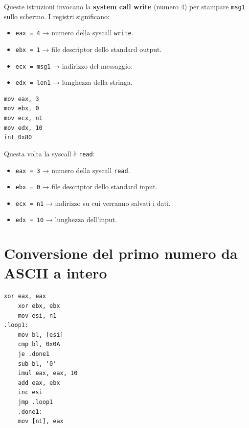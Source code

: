 \documentclass[a4paper,12pt]{article}
\begin{document}
	Queste istruzioni invocano la \textbf{system call write} (numero 4) per stampare \texttt{msg1} sullo schermo.  
	I registri significano:
	\begin{itemize}
		\item \texttt{eax = 4} → numero della syscall \texttt{write}.
		\item \texttt{ebx = 1} → file descriptor dello standard output.
		\item \texttt{ecx = msg1} → indirizzo del messaggio.
		\item \texttt{edx = len1} → lunghezza della stringa.
	\end{itemize}
	
	\begin{lstlisting}[language={[x86masm]Assembler}]
mov eax, 3
mov ebx, 0
mov ecx, n1
mov edx, 10
int 0x80
	\end{lstlisting}
	
	Questa volta la syscall è \texttt{read}:
	\begin{itemize}
		\item \texttt{eax = 3} → numero della syscall \texttt{read}.
		\item \texttt{ebx = 0} → file descriptor dello standard input.
		\item \texttt{ecx = n1} → indirizzo su cui verranno salvati i dati.
		\item \texttt{edx = 10} → lunghezza dell'input.
	\end{itemize} 
	
	\newpage
	
	\section*{Conversione del primo numero da ASCII a intero}
	\begin{lstlisting}[language={[x86masm]Assembler}]
	xor eax, eax
	xor ebx, ebx
	mov esi, n1
.loop1:
	mov bl, [esi]
	cmp bl, 0x0A
	je .done1
	sub bl, '0'
	imul eax, eax, 10
	add eax, ebx
	inc esi
	jmp .loop1
	.done1:
	mov [n1], eax
	\end{lstlisting}
	
\end{document}
